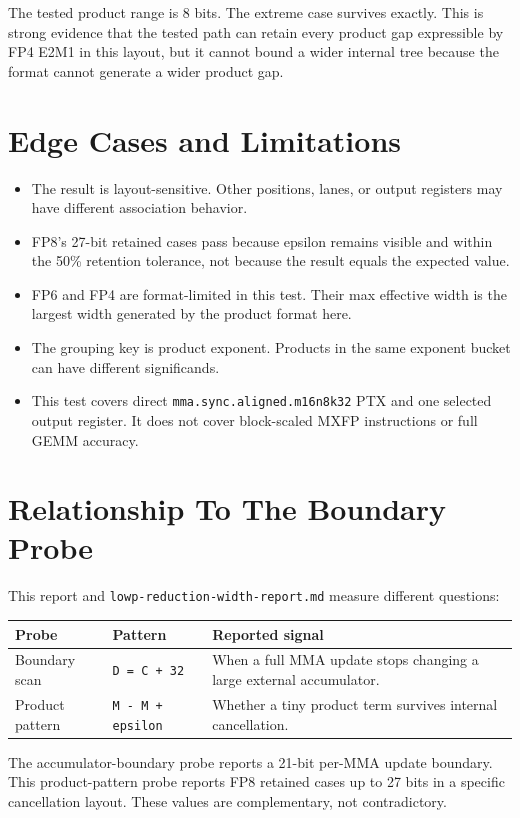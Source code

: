 \documentclass[11pt]{article}
\begin{document}
The tested product range is 8 bits. The extreme case survives exactly. This is
strong evidence that the tested path can retain every product gap expressible
by FP4 E2M1 in this layout, but it cannot bound a wider internal tree because
the format cannot generate a wider product gap.

\section{Edge Cases and Limitations}

\begin{itemize}
\item The result is layout-sensitive. Other positions, lanes, or output
  registers may have different association behavior.
\item FP8's 27-bit retained cases pass because epsilon remains visible and
  within the 50\% retention tolerance, not because the result equals the
  expected value.
\item FP6 and FP4 are format-limited in this test. Their max effective width is
  the largest width generated by the product format here.
\item The grouping key is product exponent. Products in the same exponent
  bucket can have different significands.
\item This test covers direct \texttt{mma.sync.aligned.m16n8k32} PTX and one
  selected output register. It does not cover block-scaled MXFP instructions
  or full GEMM accuracy.
\end{itemize}

\section{Relationship To The Boundary Probe}

This report and \texttt{lowp-reduction-width-report.md} measure different
questions:

\begin{tabularx}{\linewidth}{l Y Y}
\toprule
Probe & Pattern & Reported signal \\
\midrule
Boundary scan & \texttt{D = C + 32} & When a full MMA update stops changing a
large external accumulator. \\
Product pattern & \texttt{M - M + epsilon} & Whether a tiny product term
survives internal cancellation. \\
\bottomrule
\end{tabularx}

The accumulator-boundary probe reports a 21-bit per-MMA update boundary. This
product-pattern probe reports FP8 retained cases up to 27 bits in a specific
cancellation layout. These values are complementary, not contradictory.
\end{document}
